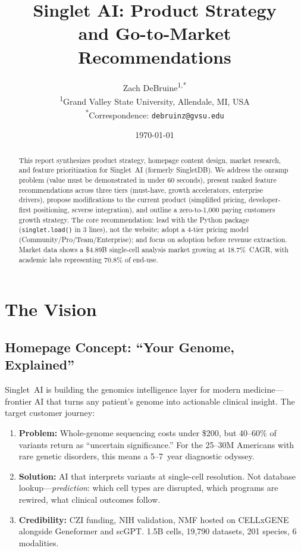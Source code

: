 \documentclass[10pt,twocolumn,letterpaper]{article}
\title{Singlet AI: Product Strategy\\
  and Go-to-Market Recommendations}
\author{%
  Zach DeBruine\textsuperscript{1,*}\\[4pt]
  \textsuperscript{1}Grand Valley State University, Allendale, MI, USA\\
  \textsuperscript{*}Correspondence: \texttt{debruinz@gvsu.edu}
}
\date{\today}
\begin{document}
\maketitle

\begin{abstract}
This report synthesizes product strategy, homepage content design, market
research, and feature prioritization for Singlet~AI (formerly SingletDB). We
address the onramp problem (value must be demonstrated in under 60 seconds),
present ranked feature recommendations across three tiers (must-have, growth
accelerators, enterprise drivers), propose modifications to the current product
(simplified pricing, developer-first positioning, scverse integration), and
outline a zero-to-1,000 paying customers growth strategy. The core
recommendation: lead with the Python package (\texttt{singlet.load()} in 3 lines),
not the website; adopt a 4-tier pricing model (Community/Pro/Team/Enterprise);
and focus on adoption before revenue extraction. Market data shows a \$4.89B
single-cell analysis market growing at 18.7\%~CAGR, with academic labs
representing 70.8\% of end-use.
\end{abstract}

\section{The Vision}
\label{sec:vision}

\subsection{Homepage Concept: ``Your Genome, Explained''}

Singlet~AI is building the genomics intelligence layer for modern medicine---
frontier AI that turns any patient's genome into actionable clinical insight.
The target customer journey:

\begin{enumerate}
  \item \textbf{Problem:} Whole-genome sequencing costs under \$200, but 40--60\%
    of variants return as ``uncertain significance.'' For the 25--30M Americans
    with rare genetic disorders, this means a 5--7~year diagnostic odyssey.
  \item \textbf{Solution:} AI that interprets variants at single-cell resolution.
    Not database lookup---\emph{prediction}: which cell types are disrupted,
    which programs are rewired, what clinical outcomes follow.
  \item \textbf{Credibility:} CZI funding, NIH validation, NMF hosted on
    CELLxGENE alongside Geneformer and scGPT. 1.5B cells, 19,790 datasets,
    201 species, 6 modalities.
\end{enumerate}
\end{document}
